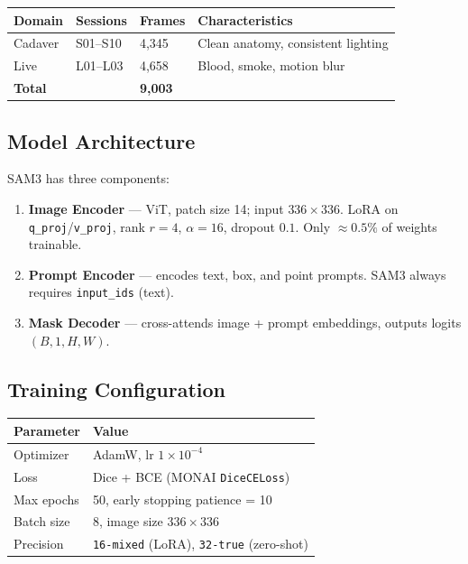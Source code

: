 \documentclass[11pt, a4paper]{article}
\begin{document}
\begin{center}
\begin{tabular}{llll}
\toprule
\textbf{Domain} & \textbf{Sessions} & \textbf{Frames} & \textbf{Characteristics} \\
\midrule
Cadaver & S01--S10 & 4{,}345 & Clean anatomy, consistent lighting \\
Live    & L01--L03 & 4{,}658 & Blood, smoke, motion blur \\
\midrule
\textbf{Total} & & \textbf{9{,}003} & \\
\bottomrule
\end{tabular}
\end{center}

\subsection{Model Architecture}
SAM3 has three components:
\begin{enumerate}[noitemsep]
    \item \textbf{Image Encoder} --- ViT, patch size 14; input $336\times336$.
          LoRA on \texttt{q\_proj}/\texttt{v\_proj}, rank $r=4$, $\alpha=16$,
          dropout $0.1$. Only $\approx0.5\%$ of weights trainable.
    \item \textbf{Prompt Encoder} --- encodes text, box, and point prompts.
          SAM3 always requires \texttt{input\_ids} (text).
    \item \textbf{Mask Decoder} --- cross-attends image + prompt embeddings,
          outputs logits $(B,1,H,W)$.
\end{enumerate}

\subsection{Training Configuration}
\begin{center}
\begin{tabular}{ll}
\toprule
\textbf{Parameter} & \textbf{Value} \\
\midrule
Optimizer        & AdamW, lr $1\times10^{-4}$ \\
Loss             & Dice + BCE (MONAI \texttt{DiceCELoss}) \\
Max epochs       & 50, early stopping patience = 10 \\
Batch size       & 8, image size $336\times336$ \\
Precision        & \texttt{16-mixed} (LoRA), \texttt{32-true} (zero-shot) \\
\bottomrule
\end{tabular}
\end{center}
\end{document}
